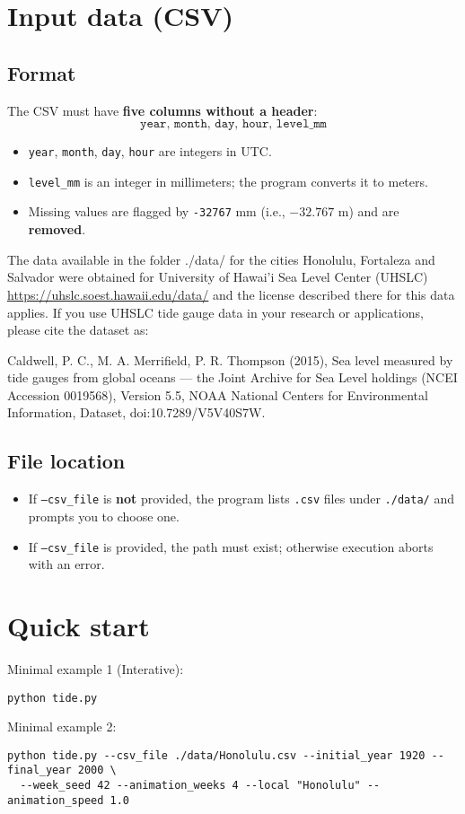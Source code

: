 \documentclass[11pt,a4paper]{article}
\begin{document}
 

\section{Input data (CSV)}
\subsection{Format}
The CSV must have \textbf{five columns without a header}:
\[
\texttt{year, month, day, hour, level\_mm}
\]
\begin{itemize}[leftmargin=1.5em]
  \item \texttt{year}, \texttt{month}, \texttt{day}, \texttt{hour} are integers in UTC.
  \item \texttt{level\_mm} is an integer in millimeters; the program converts it to meters.
  \item Missing values are flagged by \texttt{-32767} mm (i.e., $-32.767$ m) and are \textbf{removed}.
\end{itemize}

The data available in the folder ./data/ for the cities   Honolulu, Fortaleza and Salvador were obtained  for University of Hawai'i Sea Level Center (UHSLC) \url{https://uhslc.soest.hawaii.edu/data/} and the license described there for this data applies. If  you use UHSLC tide gauge data in your research or applications, please cite the dataset as:

Caldwell, P. C., M. A. Merrifield, P. R. Thompson (2015), Sea level measured by tide gauges from global oceans — the Joint Archive for Sea Level holdings (NCEI Accession 0019568), Version 5.5, NOAA National Centers for Environmental Information, Dataset, doi:10.7289/V5V40S7W.

\subsection{File location}
\begin{itemize}[leftmargin=1.5em]
  \item If \texttt{--csv\_file} is \textbf{not} provided, the program lists \texttt{.csv} files under \texttt{./data/} and prompts you to choose one.
  \item If \texttt{--csv\_file} is provided, the path must exist; otherwise execution aborts with an error.
\end{itemize}

\section{Quick start}
Minimal example 1 (Interative):
\begin{lstlisting}[style=py]
python tide.py 
\end{lstlisting}
Minimal example 2:
\begin{lstlisting}[style=py]
python tide.py --csv_file ./data/Honolulu.csv --initial_year 1920 --final_year 2000 \
  --week_seed 42 --animation_weeks 4 --local "Honolulu" --animation_speed 1.0
\end{lstlisting}
\end{document}
